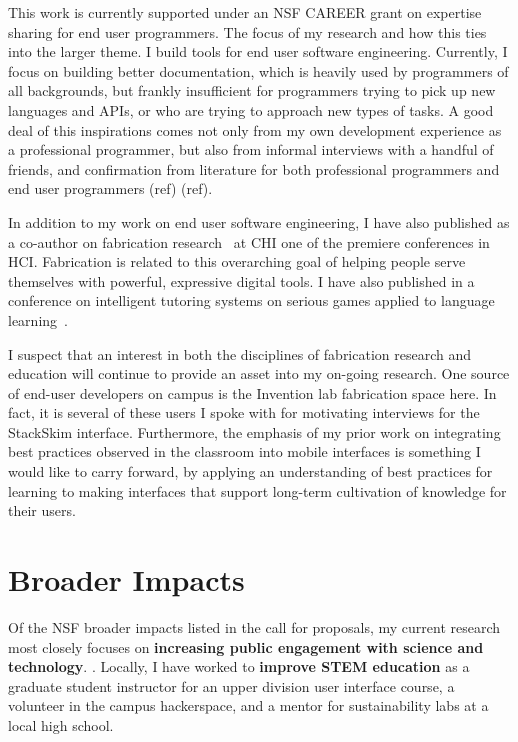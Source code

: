\documentclass[12pt]{memoir}
\begin{document}
This work is currently supported under an NSF CAREER grant on expertise sharing for end user programmers.
The focus of my research and how this ties into the larger theme.
I build tools for end user software engineering.
Currently, I focus on building better documentation, which is heavily used by programmers of all backgrounds, but frankly insufficient for programmers trying to pick up new languages and APIs, or who are trying to approach new types of tasks.
A good deal of this inspirations comes not only from my own development experience as a professional programmer, but also from informal interviews with a handful of friends, and confirmation from literature for both professional programmers and end user programmers (ref) (ref).

In addition to my work on end user software engineering, I have also published as a co-author on fabrication research~\cite{savage_lamello_2015} at CHI one of the premiere conferences in HCI\@.
Fabrication is related to this overarching goal of helping people serve themselves with powerful, expressive digital tools.
I have also published in a conference on intelligent tutoring systems on serious games applied to language learning~\cite{head_tonewars_2014}.

I suspect that an interest in both the disciplines of fabrication research and education will continue to provide an asset into my on-going research.
One source of end-user developers on campus is the Invention lab fabrication space here.
In fact, it is several of these users I spoke with for motivating interviews for the StackSkim interface.
Furthermore, the emphasis of my prior work on integrating best practices observed in the classroom into mobile interfaces is something I would like to carry forward, by applying an understanding of best practices for learning to making interfaces that support long-term cultivation of knowledge for their users.

\section{Broader Impacts}

Of the NSF broader impacts listed in the call for proposals, my current research most closely focuses on
\textbf{increasing public engagement with science and technology}.
.
Locally, I have worked to \textbf{improve STEM education} as a graduate student instructor for an upper division user interface course, a volunteer in the campus hackerspace, and a mentor for sustainability labs at a local high school.
\end{document}
